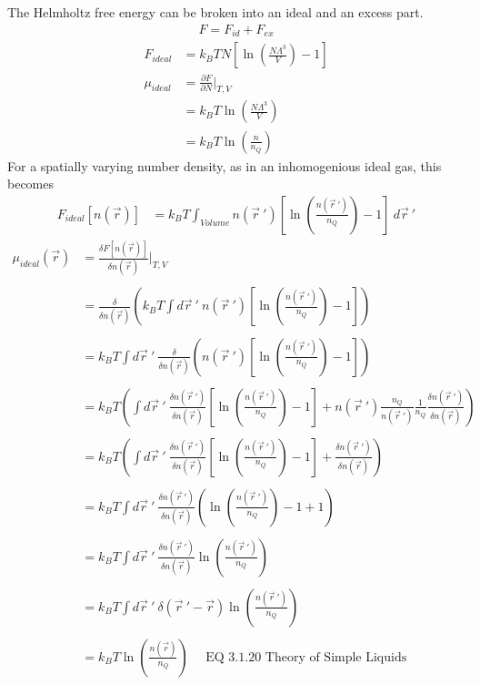 \documentclass[double,12pt]{revtex4-2}
\begin{document}
The Helmholtz free energy can be broken into an ideal and an excess part.
\begin{align}
    F = F_{id}+ F_{ex}
\end{align} 
\begin{align}
   F_{ideal}  &= k_BTN[\ln\left(\frac{N\Lambda^{3}}{V}\right)-1]  \\
%
  \mu_{ideal} &= \frac{\partial F}{\partial N}\bigg|_{T,V}   \\
              &= k_BT\ln\left(\frac{N\Lambda^{3}}{V}\right)  \\ 
              &= k_BT\ln\left(\frac{n}{n_Q}\right)
\end{align} 
For a spatially varying number density, as in an inhomogenious ideal gas,
this becomes
\begin{align}
    F_{ideal}[n(\vec{r})] &= k_BT\int_{Volume}n(\vec r~')
      \left[\ln\left(\frac{n(\vec r~')}{n_Q}\right)-1\right] ~d\vec r~' 
\end{align}
\begin{align}
 \mu_{ideal}(\vec r) &= \frac{\delta F[n(\vec r)]}{\delta 
              n(\vec r)}\bigg|_{T,V} \\ \nonumber\\
    &= \frac{\delta}{\delta n(\vec r)}
    \left(k_BT\int d\vec r~'~ n(\vec r~')\left[\ln\left(\frac{n(\vec r~')}
    {n_Q}\right)-1\right]\right) \\ \nonumber\\
    &= k_BT\int d\vec r~'~ \frac{\delta}{\delta n(\vec r)}\left(n(\vec r~')\left[\ln\left(\frac{n(\vec r~')}
    {n_Q}\right)-1\right]\right) \\ \nonumber\\
    &= k_BT\left(\int d\vec r~'~ \frac{\delta n(\vec r~')}
    {\delta n(\vec r)}\left[\ln\left(\frac{n(\vec r~')}
    {n_Q}\right)-1\right] + n(\vec r~')\frac{n_Q}{n(\vec r~')}
    \frac{1}{n_Q} \frac{\delta n(\vec r~')}{\delta n(\vec r)}
    \right)\\ \nonumber\\
    &= k_BT\left(\int d\vec r~'~ \frac{\delta n(\vec r~')}
    {\delta n(\vec r)}\left[\ln\left(\frac{n(\vec r~')}
    {n_Q}\right)-1\right] + \frac{\delta n(\vec r~')}{\delta n(\vec r)}
    \right)\\ \nonumber\\
    &= k_BT\int d\vec r~'~ \frac{\delta n(\vec r~')}
    {\delta n(\vec r)}\left(\ln\left(\frac{n(\vec r~')}
    {n_Q}\right)-1 + 1\right)\\ \nonumber\\
    &= k_BT\int d\vec r~'~ \frac{\delta n(\vec r~')}
    {\delta n(\vec r)}\ln\left(\frac{n(\vec r~')}
    {n_Q}\right)\\ \nonumber\\
    &= k_BT\int d\vec r~'~ \delta(\vec r~'-
    \vec r)\ln\left(\frac{n(\vec r~')}
    {n_Q}\right)\\ \nonumber\\
    &= k_BT\ln\left(\frac{n(\vec r)}
    {n_Q}\right)  ~~~~~~\text{EQ 3.1.20 Theory of Simple Liquids}
\end{align}
\end{document}

